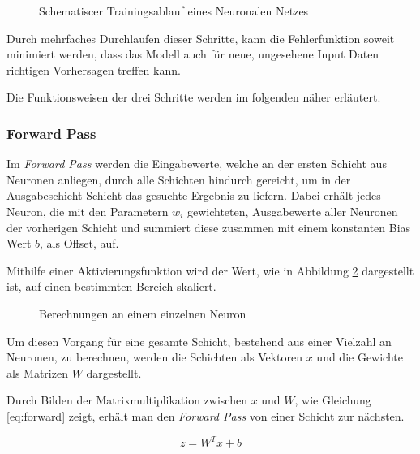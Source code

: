 \vspace{1cm}
\begin{figure}[H]
    \centering
    
    \caption{Schematiscer Trainingsablauf eines Neuronalen Netzes}
    \label{fig:train}
\end{figure}
\vspace{1cm}


Durch mehrfaches Durchlaufen dieser Schritte, 
kann die Fehlerfunktion soweit minimiert werden, dass 
das Modell auch für neue, ungesehene Input Daten 
richtigen Vorhersagen treffen kann.

Die Funktionsweisen der drei Schritte 
werden im folgenden näher erläutert.

\subsubsection{Forward Pass}
Im \textit{Forward Pass} werden die Eingabewerte, welche an der 
ersten Schicht aus Neuronen anliegen, durch alle Schichten hindurch 
gereicht, um in der Ausgabeschicht Schicht
das gesuchte Ergebnis zu liefern.
Dabei erhält jedes Neuron, die mit den Parametern $w_{i}$ gewichteten,
Ausgabewerte aller Neuronen der vorherigen Schicht und summiert diese
zusammen mit einem konstanten Bias Wert $b$, als Offset, auf.

Mithilfe einer Aktivierungsfunktion wird der Wert, wie 
in Abbildung \ref{fig:neuron} dargestellt ist, auf
einen bestimmten Bereich skaliert.


\vspace{1cm}
\begin{figure}[H]
    \centering
    
    \caption{Berechnungen an einem einzelnen Neuron}
    \label{fig:neuron}
\end{figure}
\vspace{1cm}

Um diesen Vorgang für eine gesamte Schicht, bestehend aus 
einer Vielzahl an Neuronen, zu berechnen, werden die Schichten 
als Vektoren $x$ und die Gewichte als Matrizen $W$ dargestellt.

Durch Bilden der Matrixmultiplikation zwischen $x$ und $W$,
 wie Gleichung \ref{eq:forward} zeigt,
erhält man den \textit{Forward Pass} von einer Schicht zur nächsten.
\vspace{0.5cm}

\begin{equation}
    \label{eq:forward}
    z = W^{T}x+b
\end{equation}
\vspace{0.5cm}

